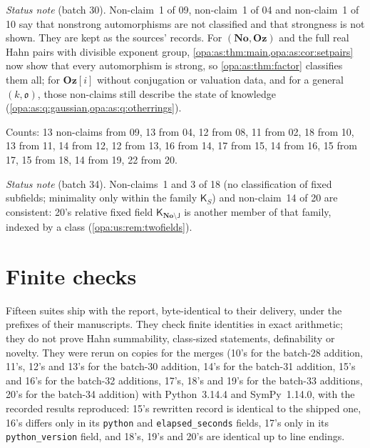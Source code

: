 \documentclass[11pt,oneside]{article}
\numberwithin{equation}{section}
\theoremstyle{definition}
\theoremstyle{remark}
\newcommand{\No}{\mathbf{No}}
\newcommand{\Oz}{\mathbf{Oz}}
\newcommand{\Og}{\mathbf{Oz}[i]}
\newcommand{\oo}{\mathfrak o}
\begin{document}
\emph{Status note} (batch 30). Non-claim~1 of 09, non-claim~1 of 04 and non-claim~1 of 10 say
that nonstrong automorphisms are not classified and that strongness is not shown. They are
kept as the sources' records. For $(\No,\Oz)$ and the full real Hahn pairs with divisible
exponent group, \cref{opa:as:thm:main,opa:as:cor:setpairs} now show that every automorphism is
strong, so \cref{opa:as:thm:factor} classifies them all; for $\Og$ without conjugation or
valuation data, and for a general $(k,\oo)$, those non-claims still describe the state of
knowledge (\cref{opa:as:q:gaussian,opa:as:q:otherrings}).

Counts: 13 non-claims from 09, 13 from 04, 12 from 08, 11 from 02, 18 from 10, 13 from 11,
14 from 12, 12 from 13, 16 from 14, 17 from 15, 14 from 16, 15 from 17, 15 from 18, 14 from 19, 22 from 20.

\emph{Status note} (batch 34). Non-claims~1 and 3 of 18 (no classification of fixed subfields; minimality only within the family $\mathsf K_S$) and
non-claim~14 of 20 are consistent: 20's relative fixed field $\mathsf K_{\No\setminus\mathsf J}$ is another member of that family, indexed by a class
(\cref{opa:us:rem:twofields}).

\section{Finite checks}\label{opa:app:checks}

Fifteen suites ship with the report, byte-identical to their delivery, under the prefixes
of their manuscripts. They check finite identities in exact arithmetic; they do not
prove Hahn summability, class-sized statements, definability or novelty. They were
rerun on copies for the merges (10's for the batch-28 addition, 11's, 12's and 13's for
the batch-30 addition, 14's for the batch-31 addition, 15's and 16's for the batch-32
additions, 17's, 18's and 19's for the batch-33 additions, 20's for the batch-34 addition) with Python~3.14.4 and SymPy~1.14.0,
with the recorded results reproduced: 15's rewritten record is identical to the shipped one,
16's differs only in its \texttt{python} and \texttt{elapsed\_seconds} fields, 17's only in its
\texttt{python\_version} field, and 18's, 19's and 20's are identical up to line endings.
\end{document}
